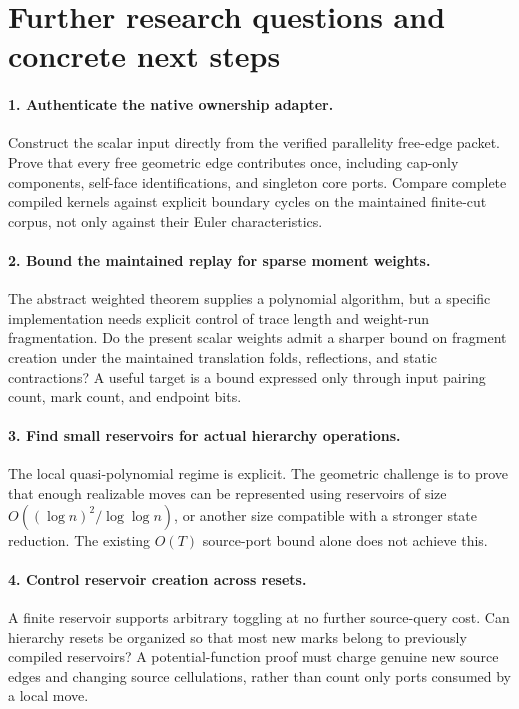 \documentclass[11pt]{article}
\theoremstyle{definition}\newtheorem{definition}[theorem]{Definition}\newtheorem{example}[theorem]{Example}
\theoremstyle{remark}\newtheorem{remark}[theorem]{Remark}
\begin{document}
\section{Further research questions and concrete next steps}
\label{sec:future}
\paragraph{1. Authenticate the native ownership adapter.}
Construct the scalar input directly from the verified parallelity free-edge packet. Prove that every free geometric edge contributes once, including cap-only components, self-face identifications, and singleton core ports. Compare complete compiled kernels against explicit boundary cycles on the maintained finite-cut corpus, not only against their Euler characteristics.

\paragraph{2. Bound the maintained replay for sparse moment weights.}
The abstract weighted theorem supplies a polynomial algorithm, but a specific implementation needs explicit control of trace length and weight-run fragmentation. Do the present scalar weights admit a sharper bound on fragment creation under the maintained translation folds, reflections, and static contractions? A useful target is a bound expressed only through input pairing count, mark count, and endpoint bits.

\paragraph{3. Find small reservoirs for actual hierarchy operations.}
The local quasi-polynomial regime is explicit. The geometric challenge is to prove that enough realizable moves can be represented using reservoirs of size $O((\log n)^2/\log\log n)$, or another size compatible with a stronger state reduction. The existing $O(T)$ source-port bound alone does not achieve this.

\paragraph{4. Control reservoir creation across resets.}
A finite reservoir supports arbitrary toggling at no further source-query cost. Can hierarchy resets be organized so that most new marks belong to previously compiled reservoirs? A potential-function proof must charge genuine new source edges and changing source cellulations, rather than count only ports consumed by a local move.
\end{document}
